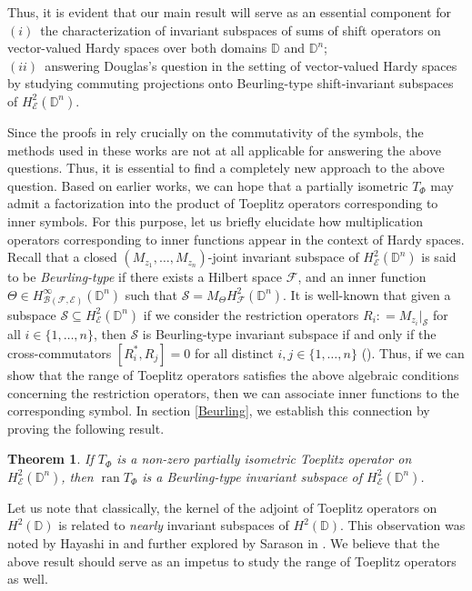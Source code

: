\documentclass[12pt]{amsart}
\newtheorem{thm}[propn]{Theorem}
\theoremstyle{definition}
\newcommand{\D}{\mathbb{D}}
\DeclareMathOperator{\ran}{ran}
\newcommand{\1}{{\mbox{\bf 1}}}
\newcommand{\clb}{\mathcal{B}}
\newcommand{\cle}{\mathcal{E}}
\newcommand{\clf}{\mathcal{F}}
\newcommand{\cls}{\mathcal{S}}
\begin{document}
Thus, it is evident that our main result will serve as an essential component for\\
$(i)$~the characterization of invariant subspaces of sums of shift operators on vector-valued Hardy spaces over both domains $\D$ and $\D^n$;\\
$(ii)$~answering Douglas's question in the setting of vector-valued Hardy spaces by studying commuting projections onto Beurling-type shift-invariant subspaces of $H_{\cle}^2(\D^n)$.

Since the proofs in \cite{BH, KPS} rely crucially on the commutativity of the symbols, the methods used in these works are not at all applicable for answering the above questions. Thus, it is essential to find a completely new approach to the above question.  Based on earlier works, we can hope that a partially isometric $T_{\Phi}$ may admit a factorization into the product of Toeplitz operators corresponding to inner symbols.  For this purpose, let us briefly elucidate how multiplication operators corresponding to inner functions appear in the context of Hardy spaces. Recall that a closed $(M_{z_1},\ldots, M_{z_n})$-joint invariant subspace of $H_{\cle}^2(\D^n)$ is said to be \textit{Beurling-type} if there exists a Hilbert space $\clf$, and an inner function $\Theta \in H_{\clb(\clf,\cle)}^{\infty}(\D^n)$ such that $\cls = M_{\Theta} H_{\clf}^2(\D^n)$. It is well-known that given a subspace $\cls \subseteq H_{\cle}^2(\D^n)$ if we consider the restriction operators $R_i: = M_{z_i}|_{\cls}$ for all $i \in \{1,\ldots,n\}$, then $\cls$ is Beurling-type invariant subspace if and only if the cross-commutators $[R_i^*, R_j] = 0$ for all distinct $i, j \in \{1,\ldots,n\}$ (\cite{Mandrekar, SSW}). Thus, if we can show that the range of Toeplitz operators satisfies the above algebraic conditions concerning the restriction operators,  then we can associate inner functions to the corresponding symbol. In section \ref{Beurling}, we establish this connection by proving the following result.
\begin{thm}\label{doubcom}
If $T_{\Phi}$ is a non-zero partially isometric Toeplitz operator on $H_{\cle}^2(\D^n)$, then $\ran T_{\Phi}$ is a Beurling-type invariant subspace of $H_{\cle}^2(\D^n)$.
\end{thm}
Let us note that classically, the kernel of the adjoint of Toeplitz operators on $H^2(\D)$ is related to \textit{nearly} invariant subspaces of $H^2(\D)$. This observation was noted by Hayashi in \cite{Hayashi} and further explored by Sarason in \cite{Sarason}.  We believe that the above result should serve as an impetus to study the range of Toeplitz operators as well.  
\end{document}

